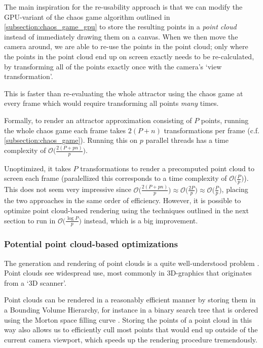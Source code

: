 \documentclass[11pt]{article}
\begin{document}
The main inspiration for the re-usability approach is that we can modify the GPU-variant of the chaos game algorithm outlined in \autoref{subsection:chaos_game_gpu}
to store the resulting points in a \emph{point cloud} instead of immediately drawing them on a canvas.
When we then move the camera around, we are able to re-use the points in the point cloud;
only where the points in the point cloud end up on screen exactly needs to be re-calculated, 
by transforming all of the points exactly once with the camera's `view transformation'.

This is faster than re-evaluating the whole attractor using the chaos game at every frame which would require transforming all points \emph{many} times.

Formally, to render an attractor approximation consisting of \(P\) points, 
running the whole chaos game each frame takes \(2(P+n)\) transformations per frame (c.f. \autoref{subsection:chaos_game}). 
Running this on \(p\) parallel threads has a time complexity of \(\mathcal{O}\big(\frac{2(P+pn)}{p}\big)\).

Unoptimized, it takes \(P\) transformations to render a precomputed point cloud to screen each frame 
(paralellized this corresponds to a time complexity of \(\mathcal{O}\big(\frac{P}{p}\big)\)).
This does not seem very impressive since \(\mathcal{O}\big(\frac{2(P+pn)}{p}\big) \approx \mathcal{O}\big(\frac{2P}{p}\big) \approx \mathcal{O}\big(\frac{P}{p}\big)\),
placing the two approaches in the same order of efficiency. However, it is possible to optimize point cloud-based rendering using the techniques outlined in the next section
to run in \(\mathcal{O}\big(\frac{\log{P}}{p}\big)\) instead, which is a big improvement.

\subsubsection{Potential point cloud-based optimizations}
\label{sec:org7fee1f7}
\label{subsection:point_cloud_optimizations}

The generation and rendering of point clouds is a quite well-understood problem \cite{wimmer2006instant}. 
Point clouds see widespread use,
most commonly in 3D-graphics that originates from a `3D scanner'.

Point clouds can be rendered in a reasonably efficient manner by storing them in a Bounding Volume Hierarchy,
for instance in a binary search tree that is ordered using the Morton space filling curve \cite{lauterbach2009construction}.
Storing the points of a point cloud in this way also allows us to efficiently cull most points that would end up outside of the current camera viewport,
which speeds up the rendering procedure tremendously.
\end{document}
